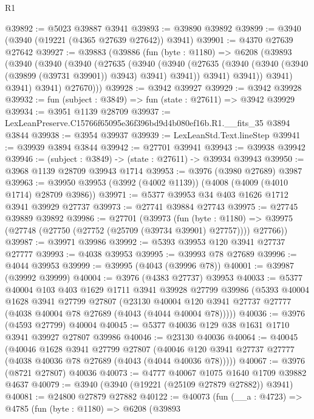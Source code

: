 \begin{lexlean}{R1}
\begin{coremodule}
@39892 := @5023 @39887 @3941
@39893 := @39890 @39892
@39899 := @3940 (@3940 (@19221 (@4365 @27639 @27642)) @3941)
@39901 := @4370 @27639 @27642
@39927 := @39883
    (@39886
      (fun (byte : @1180) =>
      @6208
        (@39893
          (@3940
            (@3940
              (@3940
                (@27635
                  (@3940
                    (@3940
                      (@27635 (@3940 (@3940 (@3940 (@39899 (@39731 @39901)) @3943) @3941) @3941))
                      @3941)
                    @3941))
                @3941)
              @3941)
            @3941)
          @27670)))
@39928 := @3942 @39927
@39929 := @3942 @39928
@39932 := fun (subject : @3849) => fun (state : @27611) => @3942 @39929
@39934 := @3951 @1139 @28709
@39937 := LexLeanPreserve.C15766f65095e36f396bd9d4b080ef16b.R1.__fits_35 @3894 @3844
@39938 := @3954 @39937
@39939 := LexLeanStd.Text.lineStep
@39941 := @39939 @3894 @3844
@39942 := @27701 @39941
@39943 := @39938 @39942
@39946 := (subject : @3849) -> (state : @27611) -> @39934 @39943
@39950 := @3968 @1139 @28709 @39943 @1714
@39953 := @3976 (@3980 @27689) @3987
@39963 := @39950 @39953 (@3992 (@4002 @1139)) (@4008 (@4009 (@4010 @1714) @28709 @3986))
@39971 := @5377 @39953 @34 @403 @1626 @1712 @3941 @39929 @27737
@39973 := @27741 @39884 @27743
@39975 := @27745 @39889 @39892
@39986 := @27701
    (@39973
      (fun (byte : @1180) =>
      @39975 (@27748 (@27750 (@27752 (@25709 (@39734 @39901) @27757)))) @27766))
@39987 := @39971 @39986
@39992 := @5393 @39953 @120 @3941 @27737 @27777
@39993 := @4038 @39953
@39995 := @39993 @78 @27689
@39996 := @4044 @39953
@39999 := @39995 (@4043 (@39996 @78))
@40001 := @39987 (@39992 @39999)
@40004 := @3976 (@4383 @27737) @39953
@40033 := @5377
    @40004
    @103
    @403
    @1629
    @1711
    @3941
    @39928
    @27799
    @39986
    (@5393
      @40004
      @1628
      @3941
      @27799
      @27807
      (@23130 @40004 @120 @3941 @27737 @27777 (@4038 @40004 @78 @27689 (@4043 (@4044 @40004 @78)))))
@40036 := @3976 (@4593 @27799) @40004
@40045 := @5377 @40036 @129 @38 @1631 @1710 @3941 @39927 @27807 @39986
@40046 := @23130 @40036
@40064 := @40045
    (@40046
      @1628
      @3941
      @27799
      @27807
      (@40046 @120 @3941 @27737 @27777 (@4038 @40036 @78 @27689 (@4043 (@4044 @40036 @78)))))
@40067 := @3976 (@8721 @27807) @40036
@40073 := @4777 @40067 @1075 @1640 @1709 @39882 @4637
@40079 := @3940 (@3940 (@19221 (@25109 @27879 @27882)) @3941)
@40081 := @24800 @27879 @27882
@40122 := @40073
    (fun (__a : @4723) =>
    @4785
      (fun (byte : @1180) =>
      @6208
        (@39893

\end{coremodule}
\end{lexlean}
